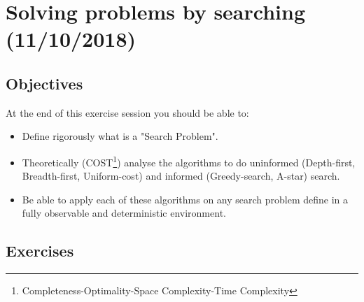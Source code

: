\documentclass[a4paper, 10pt]{article}
\begin{document}

   \newpage
   \setcounter{page}{1}
   \section{Solving problems by searching (11/10/2018)}
   \subsection{Objectives}
   At the end of this exercise session you should be able to:
   \begin{itemize}
       \item Define rigorously what is a "Search Problem".
       \item Theoretically (COST\footnote{Completeness-Optimality-Space Complexity-Time Complexity}) analyse the algorithms to do uninformed (Depth-first, Breadth-first, Uniform-cost) and informed (Greedy-search, A-star) search.
       \item Be able to apply each of these algorithms on any search problem define in a fully observable and deterministic environment.
   \end{itemize}
   \subsection{Exercises}
\end{document}
